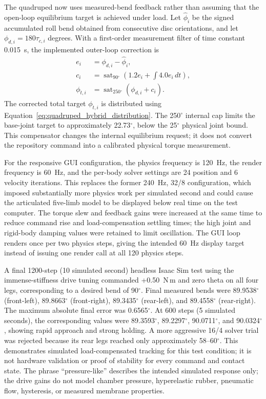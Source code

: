 \documentclass[11pt,letterpaper]{article}
\newcommand{\degrees}{\ensuremath{^{\circ}}}
\begin{document}
The quadruped now uses measured-bend feedback rather than assuming that the
open-loop equilibrium target is achieved under load. Let
$\hat{\phi}_i$ be the signed accumulated roll bend obtained from consecutive
disc orientations, and let
$\phi_{d,i}=180\tau_{c,i}$ degrees. With a first-order measurement filter of
time constant 0.015~s, the implemented outer-loop correction is
\begin{align}
 e_i &= \phi_{d,i}-\hat{\phi}_i,\\
 c_i &= \operatorname{sat}_{90\degrees{}}
       \left(1.2e_i+\int 4.0e_i\,dt\right),\\
 \phi_{t,i} &= \operatorname{sat}_{250\degrees{}}
       \left(\phi_{d,i}+c_i\right).
 \label{eq:quadruped_bend_feedback}
\end{align}
The corrected total target $\phi_{t,i}$ is distributed using
Equation~\eqref{eq:quadruped_hybrid_distribution}. The 250\degrees{} internal
cap limits the base-joint target to approximately 22.73\degrees{}, below the
25\degrees{} physical joint bound. This compensator changes the internal
equilibrium request; it does not convert the repository command into a
calibrated physical torque measurement.

For the responsive GUI configuration, the physics frequency is 120~Hz, the
render frequency is 60~Hz, and the per-body solver settings are 24 position
and 6 velocity iterations. This replaces the former 240~Hz, 32/8 configuration,
which imposed substantially more physics work per simulated second and could
cause the articulated five-limb model to be displayed below real time on the
test computer. The torque slew and feedback gains were increased at the same
time to reduce command rise and load-compensation settling times; the high
joint and rigid-body damping values were retained to limit oscillation.
The GUI loop renders once per two physics steps, giving the intended 60~Hz
display target instead of issuing one render call at all 120 physics steps.

A final 1200-step (10 simulated second) headless Isaac Sim test using the
immense-stiffness drive tuning commanded +0.50~N\,m and zero theta on all four
legs, corresponding to a desired bend of 90\degrees{}. Final measured bends
were 89.9538\degrees{} (front-left), 89.8663\degrees{} (front-right),
89.3435\degrees{} (rear-left), and 89.4558\degrees{} (rear-right). The maximum
absolute final error was 0.6565\degrees{}. At 600 steps (5 simulated seconds),
the corresponding values were 89.3593\degrees{}, 89.2297\degrees{},
90.0711\degrees{}, and 90.0324\degrees{}, showing rapid approach and strong
holding. A more aggressive 16/4 solver trial
was rejected because its rear legs reached only approximately
58--60\degrees{}. This demonstrates simulated
load-compensated tracking for this test condition; it is not hardware
validation or proof of stability for every command and contact state.
The phrase ``pressure-like'' describes the intended simulated response only;
the drive gains do not model chamber pressure, hyperelastic rubber, pneumatic
flow, hysteresis, or measured membrane properties.
\end{document}
